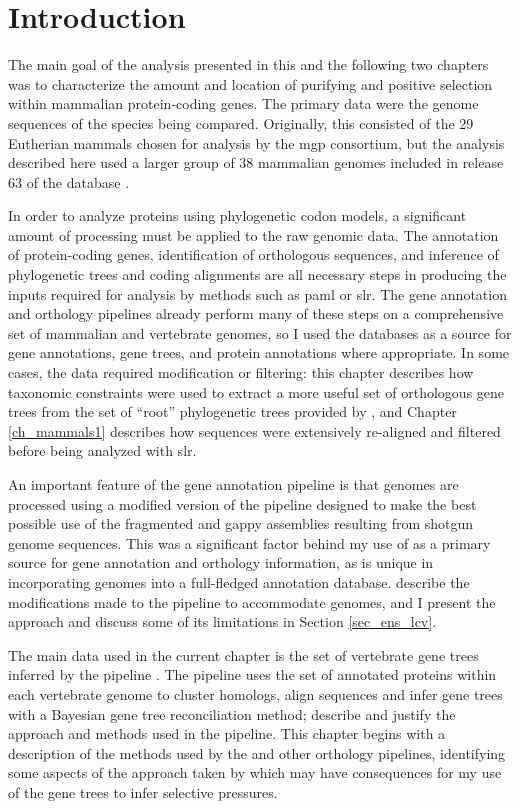 \section{Introduction}

The main goal of the analysis presented in this and the following two
chapters was to characterize the amount and location of purifying and
positive selection within mammalian protein-coding genes. The primary
data were the genome sequences of the species being
compared. Originally, this consisted of the 29 Eutherian mammals
chosen for analysis by the \ac{mgp} consortium, but the analysis
described here used a larger group of 38 mammalian genomes included in
release 63 of the \ens database \citep{Flicek2011}.

In order to analyze proteins using phylogenetic codon models, a
significant amount of processing must be applied to the raw genomic
data. The annotation of protein-coding genes, identification of
orthologous sequences, and inference of phylogenetic trees and coding
alignments are all necessary steps in producing the inputs required
for analysis by methods such as \acs{paml} or \acs{slr}. The \ens gene
annotation and orthology pipelines already perform many of these steps
on a comprehensive set of mammalian and vertebrate genomes, so I used
the \ens databases as a source for gene annotations, gene trees, and
protein annotations where appropriate. In some cases, the \ens data
required modification or filtering: this chapter describes how
taxonomic constraints were used to extract a more useful set of
orthologous gene trees from the set of ``root'' phylogenetic trees
provided by \cmp, and Chapter \ref{ch_mammals1} describes how
sequences were extensively re-aligned and filtered before being
analyzed with \ac{slr}.

An important feature of the \ens gene annotation pipeline is that \lcv
genomes are processed using a modified version of the pipeline
designed to make the best possible use of the fragmented and gappy
assemblies resulting from \lcv shotgun genome sequences. This was a
significant factor behind my use of \ens as a primary source for gene
annotation and orthology information, as \ens is unique in
incorporating \lcv genomes into a full-fledged annotation
database. \citet{Hubbard2007} describe the modifications made to the
\ens pipeline to accommodate \lcv genomes, and I present the approach
and discuss some of its limitations in Section \ref{sec_ens_lcv}.

The main data used in the current chapter is the set of vertebrate
gene trees inferred by the \ens \cmp pipeline \citep{Vilella2009}. The
\cmp pipeline uses the set of annotated proteins within each
vertebrate genome to cluster homologs, align sequences and infer gene
trees with a Bayesian gene tree reconciliation method;
\citet{Vilella2009} describe and justify the approach and methods used
in the \cmp pipeline. This chapter begins with a description of the
methods used by the \cmp and other orthology pipelines, identifying
some aspects of the approach taken by \cmp which may have consequences
for my use of the gene trees to infer \sw selective pressures.

